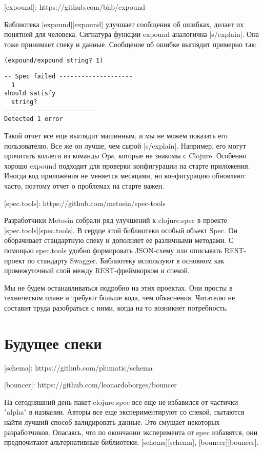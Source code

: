 [expound]: https://github.com/bhb/expound

Библиотека [expound][expound] улучшает сообщения об ошибках, делает их понятней
для человека. Сигнатура функции expound аналогична \spverb|s/explain|. Она тоже принимает
спеку и данные. Сообщение об ошибке выглядит примерно так:

\begin{verbatim}
(expound/expound string? 1)
\end{verbatim}

\begin{verbatim}
-- Spec failed --------------------
  1
should satisfy
  string?
-------------------------
Detected 1 error
\end{verbatim}

Такой отчет все еще выглядит машинным, и мы не можем показать его
пользователю. Все же он лучше, чем сырой \spverb|s/explain|. Например, его могут
прочитать коллеги из команды Ops, которые не знакомы с Clojure. Особенно хорошо
expound подходит для проверки конфигурации на старте приложения. Иногда код
приложения не меняется месяцами, но конфигурацию обновляют часто, поэтому отчет
о проблемах на старте важен.

[spec.tools]: https://github.com/metosin/spec-tools

Разработчики Metosin собрали ряд улучшений к clojure.spec в проекте
[spec.tools][spec.tools]. В сердце этой библиотеки особый объект Spec. Он
оборачивает стандартную спеку и дополняет ее различными методами. С помощью
spec.tools удобно формировать JSON-схему или описывать REST-проект по стандарту
Swagger. Библиотеку используют в основном как промежуточный слой между
REST-фреймворком и спекой.

Мы не будем останавливаться подробно на этих проектах. Они просты в техническом
плане и требуют больше кода, чем объяснения. Читателю не составит труда
разобраться с ними, когда на то возникнет потребность.

\section{Будущее спеки}

[schema]: https://github.com/plumatic/schema

[bouncer]: https://github.com/leonardoborges/bouncer

На сегодняшний день пакет clojure.spec все еще не избавился от частички "alpha"
в названии. Авторы все еще экспериментируют со спекой, пытаются найти лучший
способ валидировать данные. Это смущает некоторых разработчиков. Опасаясь, что
по окончании эксперимента от spec избавятся, они предпочитают альтернативные
библиотеки: [schema][schema], [bouncer][bouncer].

